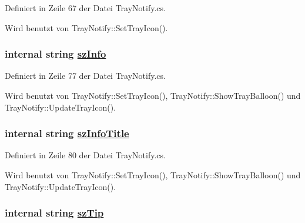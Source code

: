 Definiert in Zeile 67 der Datei Tray\-Notify.cs.

Wird benutzt von Tray\-Notify::Set\-Tray\-Icon().\hypertarget{structQbeTray_1_1TrayNotify_1_1NOTIFYICONDATA_QbeTray_1_1TrayNotify_1_1NOTIFYICONDATAo9}{
\subsubsection[szInfo]{\setlength{\rightskip}{0pt plus 5cm}internal string \hyperlink{structQbeTray_1_1TrayNotify_1_1NOTIFYICONDATA_QbeTray_1_1TrayNotify_1_1NOTIFYICONDATAo9}{sz\-Info}}}
\label{structQbeTray_1_1TrayNotify_1_1NOTIFYICONDATA_QbeTray_1_1TrayNotify_1_1NOTIFYICONDATAo9}




Definiert in Zeile 77 der Datei Tray\-Notify.cs.

Wird benutzt von Tray\-Notify::Set\-Tray\-Icon(), Tray\-Notify::Show\-Tray\-Balloon() und Tray\-Notify::Update\-Tray\-Icon().\hypertarget{structQbeTray_1_1TrayNotify_1_1NOTIFYICONDATA_QbeTray_1_1TrayNotify_1_1NOTIFYICONDATAo11}{
\subsubsection[szInfoTitle]{\setlength{\rightskip}{0pt plus 5cm}internal string \hyperlink{structQbeTray_1_1TrayNotify_1_1NOTIFYICONDATA_QbeTray_1_1TrayNotify_1_1NOTIFYICONDATAo11}{sz\-Info\-Title}}}
\label{structQbeTray_1_1TrayNotify_1_1NOTIFYICONDATA_QbeTray_1_1TrayNotify_1_1NOTIFYICONDATAo11}




Definiert in Zeile 80 der Datei Tray\-Notify.cs.

Wird benutzt von Tray\-Notify::Set\-Tray\-Icon(), Tray\-Notify::Show\-Tray\-Balloon() und Tray\-Notify::Update\-Tray\-Icon().\hypertarget{structQbeTray_1_1TrayNotify_1_1NOTIFYICONDATA_QbeTray_1_1TrayNotify_1_1NOTIFYICONDATAo6}{
\subsubsection[szTip]{\setlength{\rightskip}{0pt plus 5cm}internal string \hyperlink{structQbeTray_1_1TrayNotify_1_1NOTIFYICONDATA_QbeTray_1_1TrayNotify_1_1NOTIFYICONDATAo6}{sz\-Tip}}}
\label{structQbeTray_1_1TrayNotify_1_1NOTIFYICONDATA_QbeTray_1_1TrayNotify_1_1NOTIFYICONDATAo6}




